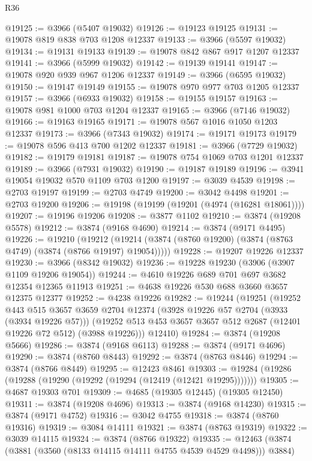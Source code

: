 \begin{lexlean}{R36}
\begin{coremodule}
@19125 := @3966 (@5407 @19032)
@19126 := @19123 @19125
@19131 := @19078 @819 @838 @703 @1208 @12337
@19133 := @3966 (@5597 @19032)
@19134 := @19131 @19133
@19139 := @19078 @842 @867 @917 @1207 @12337
@19141 := @3966 (@5999 @19032)
@19142 := @19139 @19141
@19147 := @19078 @920 @939 @967 @1206 @12337
@19149 := @3966 (@6595 @19032)
@19150 := @19147 @19149
@19155 := @19078 @970 @977 @703 @1205 @12337
@19157 := @3966 (@6933 @19032)
@19158 := @19155 @19157
@19163 := @19078 @981 @1000 @703 @1204 @12337
@19165 := @3966 (@7146 @19032)
@19166 := @19163 @19165
@19171 := @19078 @567 @1016 @1050 @1203 @12337
@19173 := @3966 (@7343 @19032)
@19174 := @19171 @19173
@19179 := @19078 @596 @413 @700 @1202 @12337
@19181 := @3966 (@7729 @19032)
@19182 := @19179 @19181
@19187 := @19078 @754 @1069 @703 @1201 @12337
@19189 := @3966 (@7931 @19032)
@19190 := @19187 @19189
@19196 := @3941 @19054 @19032 @570 @1109 @703 @1200
@19197 := @3039 @4539
@19198 := @2703 @19197
@19199 := @2703 @4749
@19200 := @3042 @4498
@19201 := @2703 @19200
@19206 := @19198 (@19199 (@19201 (@4974 (@16281 @18061))))
@19207 := @19196 @19206
@19208 := @3877 @1102
@19210 := @3874 (@19208 @5578)
@19212 := @3874 (@9168 @4690)
@19214 := @3874 (@9171 @4495)
@19226 := @19210
    (@19212 (@19214 (@3874 (@8760 @19200) (@3874 (@8763 @4749) (@3874 (@8766 @19197) @19054)))))
@19228 := @19207 @19226 @12337
@19230 := @3966 (@8342 @19032)
@19236 := @19228 @19230 (@3906 (@3907 @1109 @19206 @19054))
@19244 := @4610 @19226 @689 @701 @697 @3682 @12354 @12365 @11913
@19251 := @4638 @19226 @530 @688 @3660 @3657 @12375 @12377
@19252 := @4238 @19226
@19282 := @19244
    (@19251
      (@19252
        @443
        @515
        @3657
        @3659
        @2704
        @12374
        (@3928 @19226 @57 @2704 (@3933 (@3934 @19226 @57)))
        (@19252 @513 @453 @3657 @3657 @512 @2687 (@12401 @19226 @72 @512) (@3988 @19226)))
      @12410)
@19284 := @3874 (@19208 @5666)
@19286 := @3874 (@9168 @6113)
@19288 := @3874 (@9171 @4696)
@19290 := @3874 (@8760 @8443)
@19292 := @3874 (@8763 @8446)
@19294 := @3874 (@8766 @8449)
@19295 := @12423 @8461
@19303 := @19284 (@19286 (@19288 (@19290 (@19292 (@19294 (@12419 (@12421 @19295)))))))
@19305 := @4687 @19303 @701
@19309 := @4685 (@19305 @12445) (@19305 @12450)
@19311 := @3874 (@19208 @4696)
@19313 := @3874 (@9168 @14230)
@19315 := @3874 (@9171 @4752)
@19316 := @3042 @4755
@19318 := @3874 (@8760 @19316)
@19319 := @3084 @14111
@19321 := @3874 (@8763 @19319)
@19322 := @3039 @14115
@19324 := @3874 (@8766 @19322)
@19335 := @12463 (@3874 (@3881 (@3560 (@8133 @14115 @14111 @4755 @4539 @4529 @4498))) @3884)

\end{coremodule}
\end{lexlean}
